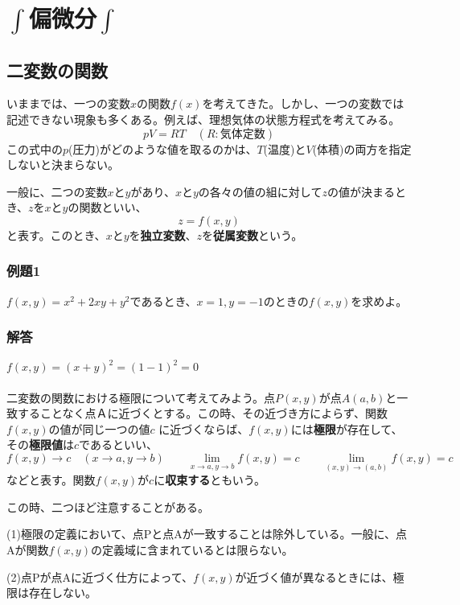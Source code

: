 \documentclass[a4j,dvipdfmx]{jsarticle}
\begin{document}
\section*{$\int$偏微分$\int$}
\subsection{二変数の関数}
いままでは、一つの変数$x$の関数$f(x)$を考えてきた。しかし、一つの変数では記述できない現象も多くある。例えば、理想気体の状態方程式を考えてみる。
\begin{equation*}
    pV=RT\quad(R:\text{気体定数})
\end{equation*}
この式中の$p$(圧力)がどのような値を取るのかは、$T$(温度)と$V$(体積)の両方を指定しないと決まらない。

一般に、二つの変数$x$と$y$があり、$x$と$y$の各々の値の組に対して$z$の値が決まるとき、$z$を$x$と$y$の関数といい、
\begin{equation*}
    z=f(x,y)
\end{equation*}
と表す。このとき、$x$と$y$を\textbf{独立変数}、$z$を\textbf{従属変数}という。
\subsubsection*{例題1}
$f(x,y)=x^2+2xy+y^2$であるとき、$x=1,y=-1$のときの$f(x,y)$を求めよ。

\subsubsection*{解答}
$f(x,y)=(x+y)^2=(1-1)^2=0$
\\\\
二変数の関数における極限について考えてみよう。点$P(x,y)$が点$A(a,b)$と一致することなく点Ａに近づくとする。この時、その近づき方によらず、関数$f(x,y)$の値が同じ一つの値$c$
に近づくならば、$f(x,y)$には\textbf{極限}が存在して、その\textbf{極限値}は$c$であるといい、
\begin{equation*}
    f(x,y)\to c\quad(x\to a,y\to b)\qquad\lim_{x\to a,y\to b}f(x,y)=c\qquad\lim_{(x,y)\to(a,b)}f(x,y)=c
\end{equation*}
などと表す。関数$f(x,y)$が$c$に\textbf{収束する}ともいう。

この時、二つほど注意することがある。

(1)極限の定義において、点Pと点Aが一致することは除外している。一般に、点Aが関数$f(x,y)$の定義域に含まれているとは限らない。

(2)点Pが点Aに近づく仕方によって、$f(x,y)$が近づく値が異なるときには、極限は存在しない。
\end{document}
